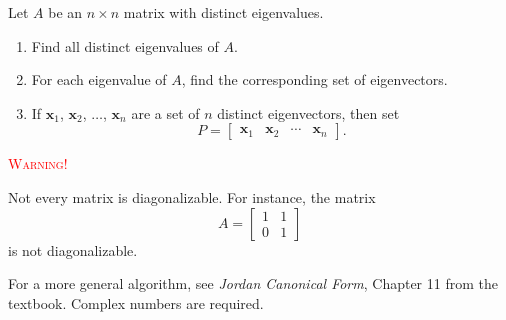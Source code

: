 \documentclass[20pt,a4paper]{extarticle}
\newcounter{algo}
\begin{document}
\begin{algorithm}
Let $A$ be an $n \times n$ matrix with distinct eigenvalues.
	\begin{enumerate}[label=\Circled{\arabic*}]
		\item Find all distinct eigenvalues of $A$.
		\item For each eigenvalue of $A$, find the corresponding set of eigenvectors.
		\item If $\mathbf{x}_1$, $\mathbf{x}_2$, $\ldots$, $\mathbf{x}_n$ are a set of $n$ distinct eigenvectors, then set
			\[
				P = \begin{bmatrix} \mathbf{x}_1 & \mathbf{x}_2 & \cdots & \mathbf{x}_n \end{bmatrix} .
			\]
	\end{enumerate}
\end{algorithm}


\textcolor{red}{\textsc{Warning!}}

Not every matrix is diagonalizable. For instance, the matrix
	\[
		A = \begin{bmatrix} 1 & 1 \\ 0 & 1 \end{bmatrix}
	\]
is not diagonalizable. 

For a more general algorithm, see \textit{Jordan Canonical Form}, Chapter 11 from the textbook. Complex numbers are required.
\end{document}
